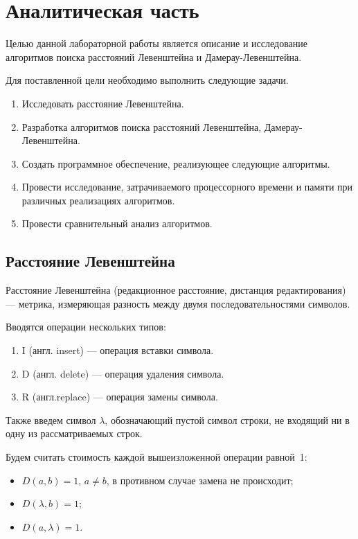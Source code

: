 \chapter{Аналитическая часть}
\label{sec:targets}
Целью данной лабораторной работы является описание и исследование алгоритмов поиска расстояний Левенштейна и Дамерау-Левенштейна.


Для поставленной цели необходимо выполнить следующие задачи.
\begin{enumerate}[label={\arabic*}]
	\item Исследовать расстояние Левенштейна.
	\item Разработка алгоритмов поиска расстояний Левенштейна, Дамерау-Левенштейна.
	\item Создать программное обеспечение, реализующее следующие алгоритмы.
	\item Провести исследование, затрачиваемого процессорного времени и памяти при различных реализациях алгоритмов.
	\item Провести сравнительный анализ алгоритмов.
\end{enumerate}

\section{Расстояние Левенштейна}


Расстояние Левенштейна (редакционное расстояние, дистанция редактирования) --- метрика, измеряющая разность между двумя последовательностями символов.

Вводятся операции нескольких типов:
\begin{enumerate}[label=\arabic*.]
	\item I (англ. insert) --- операция вставки символа.
	\item D (англ. delete) --- операция удаления символа.
	\item R (англ.replace) --- операция замены символа.
\end{enumerate}
Также введем символ $\lambda$, обозначающий пустой символ строки, не входящий ни в одну из рассматриваемых строк.

Будем считать стоимость каждой вышеизложенной операции равной~1:
\begin{itemize}[label=---]
	\item $D(a, b) = 1$, $a \neq b$, в противном случае замена не происходит;
	\item $D(\lambda, b) = 1$;
	\item $D(a, \lambda) = 1$.
\end{itemize}


